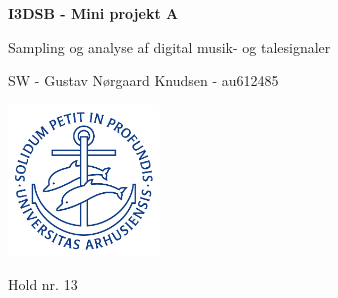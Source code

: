 \documentclass{article}
\begin{document}

\begin{titlepage}
    
  \begin{center}
    \vspace*{1cm}

    \Huge
    \textbf{I3DSB - Mini projekt A}

    \vspace{0.5cm}
    \huge
    Sampling og analyse af digital musik- og talesignaler \\
    \date\today

    \vspace{3cm}

    \Large
    SW - Gustav Nørgaard Knudsen - au612485 
    
    \vfill
    \includegraphics[width=0.3\textwidth]{au2}
    \vspace{2cm}

    Hold nr. 13

  \end{center}
\end{titlepage}

\newpage
\newpage

\setcounter{page}{1}

\end{document}
